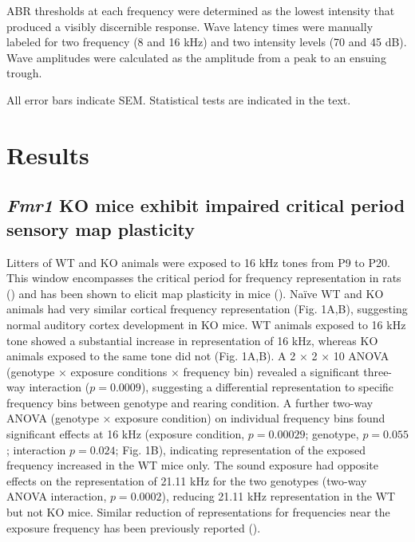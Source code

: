 ABR thresholds at each frequency were determined as the lowest intensity that produced a visibly discernible response. Wave latency times were manually labeled for two frequency (8 and 16 kHz) and two intensity levels (70 and 45 dB). Wave amplitudes were calculated as the amplitude from a peak to an ensuing trough.

All error bars indicate SEM. Statistical tests are indicated in the text.

\section{Results}

\subsection{\textit{Fmr1} KO mice exhibit impaired critical period sensory map plasticity}

Litters of WT and KO animals were exposed to 16 kHz tones from P9 to P20. This window encompasses the critical period for frequency representation in rats (\cite{DeVillers-Sidani2007, Insanally2009}) and has been shown to elicit map plasticity in mice (\cite{Barkat2011}). Na\"ive WT and KO animals had very similar cortical frequency representation (Fig. 1A,B), suggesting normal auditory cortex development in KO mice. WT animals exposed to 16 kHz tone showed a substantial increase in representation of 16 kHz, whereas KO animals exposed to the same tone did not (Fig. 1A,B). A 2 × 2 × 10 ANOVA (genotype × exposure conditions × frequency bin) revealed a significant three-way interaction ($p=0.0009$), suggesting a differential representation to specific frequency bins between genotype and rearing condition. A further two-way ANOVA (genotype × exposure condition) on individual frequency bins found significant effects at 16 kHz (exposure condition, $p=0.00029$; genotype, $p=0.055$; interaction $p=0.024$; Fig. 1B), indicating representation of the exposed frequency increased in the WT mice only. The sound exposure had opposite effects on the representation of 21.11 kHz for the two genotypes (two-way ANOVA interaction, $p=0.0002$), reducing 21.11 kHz representation in the WT but not KO mice. Similar reduction of representations for frequencies near the exposure frequency has been previously reported (\cite{Han2007}).


